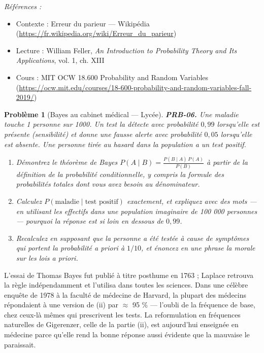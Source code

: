\documentclass[11pt]{article}
\newtheorem{problem}{Problème}
\newenvironment{refs}{\par\small\noindent\emph{Références :}\begin{itemize}\setlength\itemsep{0pt}}{\end{itemize}\normalsize}
\begin{document}
\begin{refs}
\item Contexte : Erreur du parieur --- Wikipédia (\url{https://fr.wikipedia.org/wiki/Erreur_du_parieur})
\item Lecture : William Feller, \textit{An Introduction to Probability Theory and Its Applications}, vol. 1, ch. XIII
\item Cours : MIT OCW 18.600 Probability and Random Variables (\url{https://ocw.mit.edu/courses/18-600-probability-and-random-variables-fall-2019/})
\end{refs}

\bigskip

\begin{problem}[{Bayes au cabinet médical --- Lycée}]
\textbf{PRB-06.} Une maladie touche 1 personne sur 1000. Un test la
détecte avec probabilité $ 0{,}99 $ lorsqu'elle est présente (sensibilité) et donne une fausse
alerte avec probabilité $ 0{,}05 $ lorsqu'elle est absente. Une personne tirée au hasard dans la
population a un test positif.
\begin{enumerate}
\item[(i)] Démontrez le théorème de Bayes
$ P(A\mid B) = \frac{P(B\mid A)\,P(A)}{P(B)} $ à partir de la définition de la probabilité
conditionnelle, y compris la formule des probabilités totales dont vous avez besoin au
dénominateur.
\item[(ii)] Calculez $ P(\text{maladie} \mid \text{test positif}) $ exactement, et expliquez avec des
mots --- en utilisant les effectifs dans une population imaginaire de 100 000 personnes ---
pourquoi la réponse est si loin en dessous de $ 0{,}99 $.
\item[(iii)] Recalculez en supposant que la personne a été testée à cause de symptômes qui portent la
probabilité a priori à $ 1/10 $, et énoncez en une phrase la morale sur les lois a priori.
\end{enumerate}

\end{problem}

\noindent L'essai de Thomas Bayes fut publié à titre posthume en 1763 ; Laplace retrouva
la règle indépendamment et l'utilisa dans toutes les sciences. Dans une célèbre enquête de 1978 à
la faculté de médecine de Harvard, la plupart des médecins répondaient à une version de (ii) par
$\approx$ 95 \% --- l'oubli de la fréquence de base, chez ceux-là mêmes qui prescrivent les tests. La
reformulation en \og{} fréquences naturelles \fg{} de Gigerenzer, celle de la partie (ii), est aujourd'hui
enseignée en médecine parce qu'elle rend la bonne réponse aussi évidente que la mauvaise le
paraissait.
\end{document}
